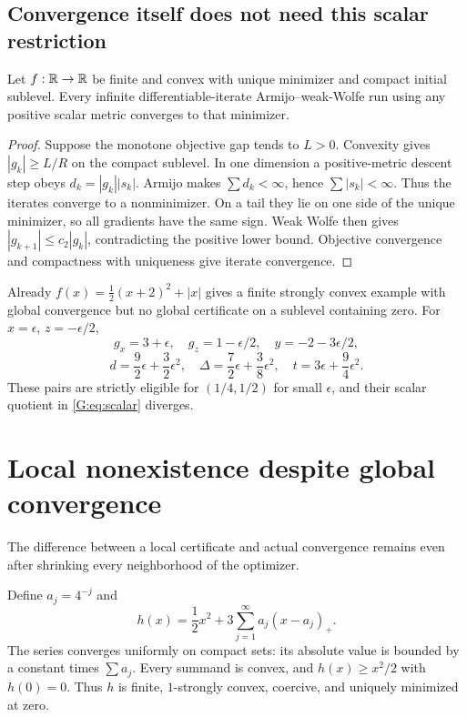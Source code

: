 \subsection{Convergence itself does not need this scalar restriction}
\begin{proposition}\label{G:prop:scalarconv}
Let $f:\mathbb R\to\mathbb R$ be finite and convex with unique minimizer and compact initial sublevel. Every infinite differentiable-iterate Armijo--weak-Wolfe run using any positive scalar metric converges to that minimizer.
\end{proposition}
\begin{proof}
Suppose the monotone objective gap tends to $L>0$. Convexity gives $|g_k|\ge L/R$ on the compact sublevel. In one dimension a positive-metric descent step obeys $d_k=|g_k||s_k|$. Armijo makes $\sum d_k<\infty$, hence $\sum|s_k|<\infty$. Thus the iterates converge to a nonminimizer. On a tail they lie on one side of the unique minimizer, so all gradients have the same sign. Weak Wolfe then gives $|g_{k+1}|\le c_2|g_k|$, contradicting the positive lower bound. Objective convergence and compactness with uniqueness give iterate convergence.
\end{proof}
Already $f(x)=\frac12(x+2)^2+|x|$ gives a finite strongly convex example with global convergence but no global certificate on a sublevel containing zero. For $x=\epsilon$, $z=-\epsilon/2$,
\[
 g_x=3+\epsilon,\quad g_z=1-\epsilon/2,\quad y=-2-3\epsilon/2,
\]
\[
 d=\frac92\epsilon+\frac32\epsilon^2,\quad
 \Delta=\frac72\epsilon+\frac38\epsilon^2,\quad
 t=3\epsilon+\frac94\epsilon^2.
\]
These pairs are strictly eligible for $(1/4,1/2)$ for small $\epsilon$, and their scalar quotient in \eqref{G:eq:scalar} diverges.


\setcounter{section}{6}
\setcounter{theorem}{0}
\setcounter{equation}{6}
\section{Local nonexistence despite global convergence}
The difference between a local certificate and actual convergence remains even after shrinking every neighborhood of the optimizer.

Define $a_j=4^{-j}$ and
\begin{equation}
 h(x)=\frac12x^2+3\sum_{j=1}^\infty a_j(x-a_j)_+. \label{G:eq:infinite}
\end{equation}
The series converges uniformly on compact sets: its absolute value is bounded by a constant times $\sum a_j$. Every summand is convex, and $h(x)\ge x^2/2$ with $h(0)=0$. Thus $h$ is finite, $1$-strongly convex, coercive, and uniquely minimized at zero.

